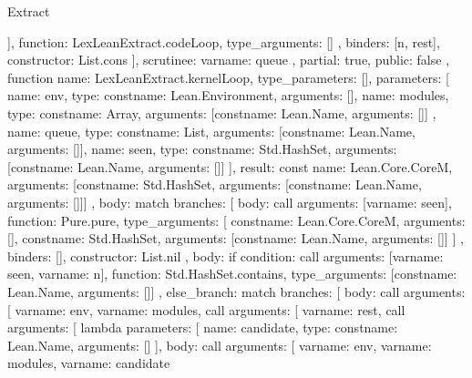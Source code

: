 \begin{lexlean}{Extract}
\begin{toolingmodule}
{{{{{{                ],
                function: LexLeanExtract.codeLoop,
                type_arguments: []
              }
            },
            binders: [n, rest],
            constructor: List.cons
          }
        ],
        scrutinee: var{name: queue}
      },
      partial: true,
      public: false
    },
    function{
      name: LexLeanExtract.kernelLoop,
      type_parameters: [],
      parameters: [
        {name: env, type: const{name: Lean.Environment, arguments: []}},
        {
          name: modules,
          type: const{name: Array, arguments: [const{name: Lean.Name, arguments: []}]}
        },
        {name: queue, type: const{name: List, arguments: [const{name: Lean.Name, arguments: []}]}},
        {
          name: seen,
          type: const{name: Std.HashSet, arguments: [const{name: Lean.Name, arguments: []}]}
        }
      ],
      result: const{
        name: Lean.Core.CoreM,
        arguments: [const{name: Std.HashSet, arguments: [const{name: Lean.Name, arguments: []}]}]
      },
      body: match{
        branches: [
          {
            body: call{
              arguments: [var{name: seen}],
              function: Pure.pure,
              type_arguments: [
                const{name: Lean.Core.CoreM, arguments: []},
                const{name: Std.HashSet, arguments: [const{name: Lean.Name, arguments: []}]}
              ]
            },
            binders: [],
            constructor: List.nil
          },
          {
            body: if{
              condition: call{
                arguments: [var{name: seen}, var{name: n}],
                function: Std.HashSet.contains,
                type_arguments: [const{name: Lean.Name, arguments: []}]
              },
              else_branch: match{
                branches: [
                  {
                    body: call{
                      arguments: [
                        var{name: env},
                        var{name: modules},
                        call{
                          arguments: [
                            var{name: rest},
                            call{
                              arguments: [
                                lambda{
                                  parameters: [
                                    {name: candidate, type: const{name: Lean.Name, arguments: []}}
                                  ],
                                  body: call{
                                    arguments: [
                                      var{name: env},
                                      var{name: modules},
                                      var{name: candidate}
}}}}}}}}}}}}
\end{toolingmodule}
\end{lexlean}
